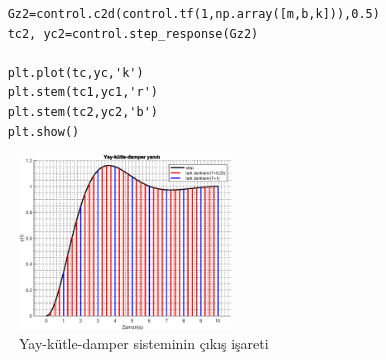 \begin{enumerate}
\begin{lstlisting}
    Gz2=control.c2d(control.tf(1,np.array([m,b,k])),0.5)
    tc2, yc2=control.step_response(Gz2)

    plt.plot(tc,yc,'k')
    plt.stem(tc1,yc1,'r')
    plt.stem(tc2,yc2,'b')
    plt.show()
    \end{lstlisting}
    \begin{figure}[!htb]
        \centering
        \includegraphics[width=0.5\textwidth]{img/lec3_step2}
        \caption{Yay-kütle-damper sisteminin çıkış işareti}
        \label{fig:lec3_step2}
    \end{figure}
\end{enumerate}